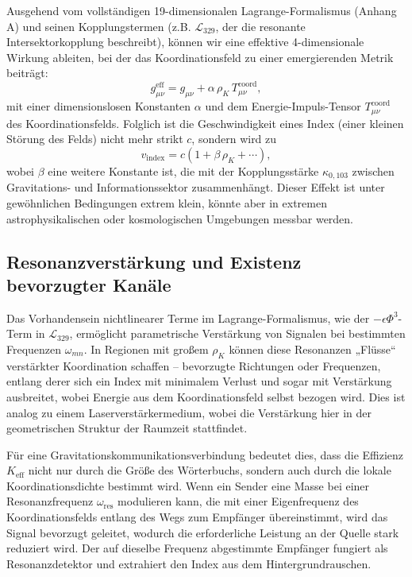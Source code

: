 \documentclass[12pt,a4paper]{article}
\newcommand{\Keff}{K_{\mathrm{eff}}}
\begin{document}
	Ausgehend vom vollständigen 19-dimensionalen Lagrange-Formalismus (Anhang A) und seinen Kopplungstermen (z.B. \(\mathcal{L}_{329}\), der die resonante Intersektorkopplung beschreibt), können wir eine effektive 4-dimensionale Wirkung ableiten, bei der das Koordinationsfeld zu einer emergierenden Metrik beiträgt:
	\begin{equation}
		g_{\mu\nu}^{\mathrm{eff}} = g_{\mu\nu} + \alpha \, \rho_K \, T_{\mu\nu}^{\mathrm{coord}},
	\end{equation}
	mit einer dimensionslosen Konstanten \(\alpha\) und dem Energie-Impuls-Tensor \(T_{\mu\nu}^{\mathrm{coord}}\) des Koordinationsfelds. Folglich ist die Geschwindigkeit eines Index (einer kleinen Störung des Felds) nicht mehr strikt \(c\), sondern wird zu
	\begin{equation}
		v_{\mathrm{index}} = c \left(1 + \beta \, \rho_K + \cdots \right),
	\end{equation}
	wobei \(\beta\) eine weitere Konstante ist, die mit der Kopplungsstärke \(\kappa_{0,103}\) zwischen Gravitations- und Informationssektor zusammenhängt. Dieser Effekt ist unter gewöhnlichen Bedingungen extrem klein, könnte aber in extremen astrophysikalischen oder kosmologischen Umgebungen messbar werden.
	
	\subsection{Resonanzverstärkung und Existenz bevorzugter Kanäle}
	
	Das Vorhandensein nichtlinearer Terme im Lagrange-Formalismus, wie der \(-\epsilon \Phi^3\)-Term in \(\mathcal{L}_{329}\), ermöglicht parametrische Verstärkung von Signalen bei bestimmten Frequenzen \(\omega_{mn}\). In Regionen mit großem \(\rho_K\) können diese Resonanzen „Flüsse“ verstärkter Koordination schaffen – bevorzugte Richtungen oder Frequenzen, entlang derer sich ein Index mit minimalem Verlust und sogar mit Verstärkung ausbreitet, wobei Energie aus dem Koordinationsfeld selbst bezogen wird. Dies ist analog zu einem Laserverstärkermedium, wobei die Verstärkung hier in der geometrischen Struktur der Raumzeit stattfindet.
	
	Für eine Gravitationskommunikationsverbindung bedeutet dies, dass die Effizienz \(\Keff\) nicht nur durch die Größe des Wörterbuchs, sondern auch durch die lokale Koordinationsdichte bestimmt wird. Wenn ein Sender eine Masse bei einer Resonanzfrequenz \(\omega_{\mathrm{res}}\) modulieren kann, die mit einer Eigenfrequenz des Koordinationsfelds entlang des Wegs zum Empfänger übereinstimmt, wird das Signal bevorzugt geleitet, wodurch die erforderliche Leistung an der Quelle stark reduziert wird. Der auf dieselbe Frequenz abgestimmte Empfänger fungiert als Resonanzdetektor und extrahiert den Index aus dem Hintergrundrauschen.
	
\end{document}

